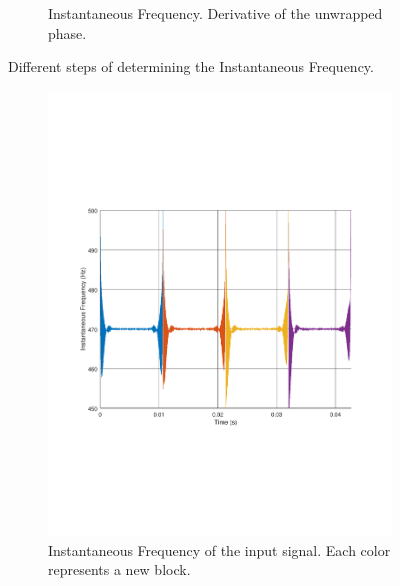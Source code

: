 \begin{figure}
\begin{subfigure}[t]{.5\textwidth}
		\caption{Instantaneous Frequency. Derivative of the unwrapped phase.}
		\label{fig:IFsub3}
	\end{subfigure} 
	\caption{Different steps of determining the Instantaneous Frequency.}
	\label{fig:IFexplained}
\end{figure}
\begin{figure}
	\centering
	\begin{subfigure}[t]{.49\textwidth}
		\centering
		\includegraphics[width=.9\linewidth, clip, trim={2cm 7cm 2cm 7cm}]{gfx/Modelling/IF.pdf}
		\caption{Instantaneous Frequency of the input signal. Each color represents a new block.}
		\label{fig:IFout1}
	\end{subfigure} \hfill
	\begin{subfigure}[t]{.49\textwidth}
		\centering

\end{subfigure}
\end{figure}
